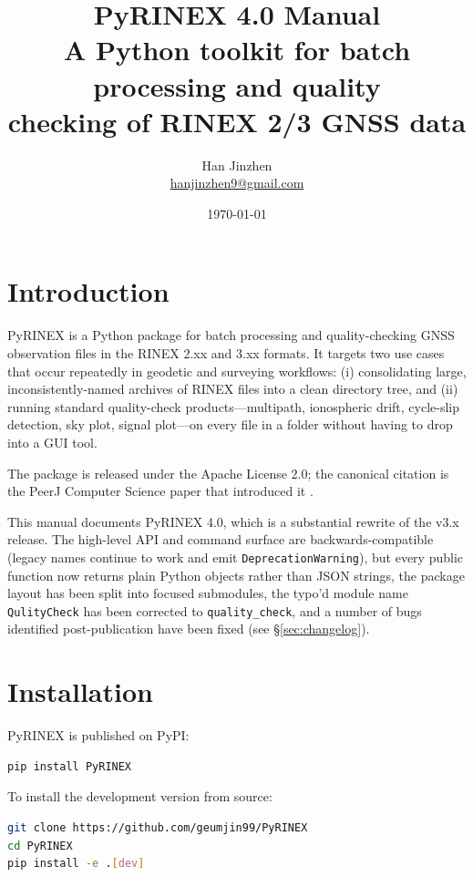 \documentclass[11pt,a4paper]{article}
\title{\textbf{PyRINEX 4.0 Manual}\\
\large A Python toolkit for batch processing and quality\\
checking of RINEX 2/3 GNSS data}
\author{Han Jinzhen \\ \href{mailto:hanjinzhen9@gmail.com}{hanjinzhen9@gmail.com}}
\date{\today}
\begin{document}
\maketitle
\tableofcontents
\bigskip

\section{Introduction}

PyRINEX is a Python package for batch processing and quality-checking
GNSS observation files in the RINEX 2.xx and 3.xx formats. It targets
two use cases that occur repeatedly in geodetic and surveying
workflows: (i) consolidating large, inconsistently-named archives of
RINEX files into a clean directory tree, and (ii) running standard
quality-check products---multipath, ionospheric drift, cycle-slip
detection, sky plot, signal plot---on every file in a folder without
having to drop into a GUI tool.

The package is released under the Apache License 2.0; the canonical
citation is the PeerJ Computer Science paper that introduced it
\cite{han2024pyrinex}.

This manual documents PyRINEX 4.0, which is a substantial rewrite of
the v3.x release. The high-level API and command surface are
backwards-compatible (legacy names continue to work and emit
\texttt{DeprecationWarning}), but every public function now returns
plain Python objects rather than JSON strings, the package layout has
been split into focused submodules, the typo'd module name
\texttt{QulityCheck} has been corrected to \texttt{quality\_check},
and a number of bugs identified post-publication have been fixed
(see \S\ref{sec:changelog}).

\section{Installation}
\label{sec:install}

PyRINEX is published on PyPI:

\begin{lstlisting}[language=bash]
pip install PyRINEX
\end{lstlisting}

To install the development version from source:

\begin{lstlisting}[language=bash]
git clone https://github.com/geumjin99/PyRINEX
cd PyRINEX
pip install -e .[dev]
\end{lstlisting}
\end{document}
